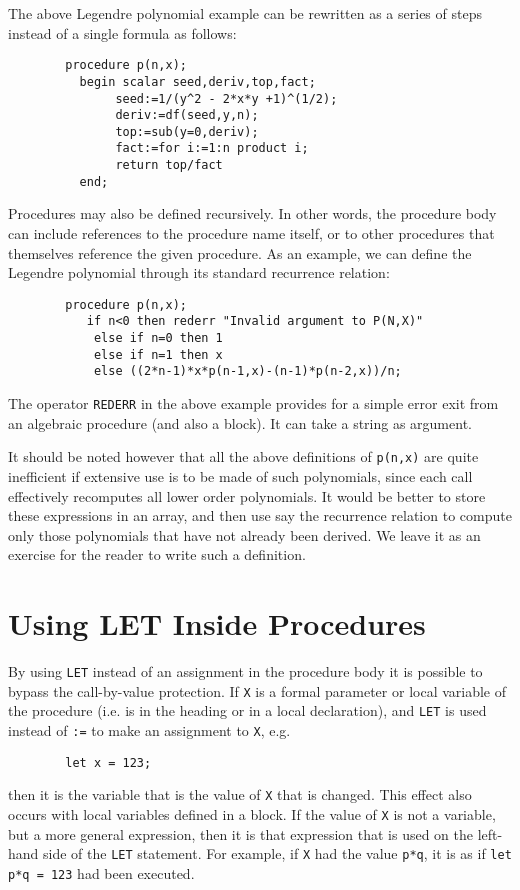 \documentclass[11pt,letterpaper]{book}
\makeatletter
\newcommand{\underscore}{\_}
\newcommand{\ttindex}[1]{{\renewcommand{\_}{\protect\underscore}%
                          \index{#1@{\tt #1}}}}
\makeatother
\begin{document}
The above Legendre polynomial example can be rewritten as a series of steps
instead of a single formula as follows:
{\small\begin{verbatim}
        procedure p(n,x);
          begin scalar seed,deriv,top,fact;
               seed:=1/(y^2 - 2*x*y +1)^(1/2);
               deriv:=df(seed,y,n);
               top:=sub(y=0,deriv);
               fact:=for i:=1:n product i;
               return top/fact
          end;
\end{verbatim}}
Procedures may also be defined recursively.  In other words, the procedure
body can include references to the procedure name
itself, or to other procedures that themselves reference the given
procedure.  As an example, we can define the Legendre polynomial through
its standard recurrence relation:
{\small\begin{verbatim}
        procedure p(n,x);
           if n<0 then rederr "Invalid argument to P(N,X)"
            else if n=0 then 1
            else if n=1 then x
            else ((2*n-1)*x*p(n-1,x)-(n-1)*p(n-2,x))/n;
\end{verbatim}}

The operator {\tt REDERR}\ttindex{REDERR} in the above example provides
for a simple error exit from an algebraic procedure (and also a block).
It can take a string as argument.

It should be noted however that all the above definitions of {\tt p(n,x)} are
quite inefficient if extensive use is to be made of such polynomials, since
each call effectively recomputes all lower order polynomials. It would be
better to store these expressions in an array, and then use say the
recurrence relation to compute only those polynomials that have not already
been derived. We leave it as an exercise for the reader to write such a
definition.


\section{Using LET Inside Procedures}

By using {\tt LET}\ttindex{LET} instead of an assignment in the procedure
body it is possible to bypass the call-by-value
 protection.  If {\tt X} is a formal parameter or local
variable of the procedure (i.e. is in the heading or in a local
declaration), and {\tt LET} is used instead of {\tt :=} to make an
assignment to {\tt X}, e.g.

{\small\begin{verbatim}
        let x = 123;
\end{verbatim}}
then it is the variable that is the value of {\tt X} that is changed.
This effect also occurs with local variables defined in a block.  If the
value of {\tt X} is not a variable, but a more general expression, then it
is that expression that is used on the left-hand side of the {\tt LET}
statement.  For example, if {\tt X} had the value {\tt p*q}, it is as if
{\tt let p*q = 123} had been executed.
\end{document}
